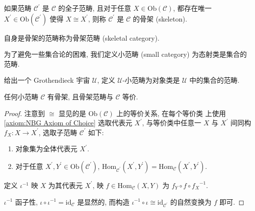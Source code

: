 \begin{definition}[骨架]
    如果范畴 \(\mathcal{C}^\prime\) 是 \(\mathcal{C}\) 的全子范畴, 且对于任意 \(X \in \mathrm{Ob} (\mathcal{C})\),
    都存在唯一 \(X^\prime \in \mathrm{Ob} (\mathcal{C}^\prime)\) 使得 \(X \cong X^\prime\), 则称 \(\mathcal{C}^\prime\) 是 \(\mathcal{C}\) 的骨架 (skeleton).

    自身是骨架的范畴称为骨架范畴 (skeletal category).
\end{definition}

\begin{definition}[小范畴]
    为了避免一些集合论的困难, 我们定义小范畴 (small category) 为态射类是集合的范畴.

    给出一个 Grothendieck 宇宙 \(\mathcal{U}\), 定义 \(\mathcal{U}\)-小范畴为对象类是 \(\mathcal{U}\) 中的集合的范畴.
\end{definition}

\begin{lemma}
    任何小范畴 \(\mathcal{C}\) 有骨架, 且骨架范畴与 \(\mathcal{C}\) 等价.

    \begin{proof}
        注意到 \(\cong\) 显见的是 \(\mathrm{Ob} (\mathcal{C})\) 上的等价关系, 在每个等价类
        上使用 \ref{axiom:NBG Axiom of Choice} 选取代表元 \(X^\prime\), 与等价类中任意一 \(X\) 与 \(X^\prime\) 间同构 \(f_X : X \to X^\prime\),
        选取子范畴 \(\mathcal{C}^\prime\) 如下:

        \begin{enumerate}
            \item 对象集为全体代表元 \(X^\prime\).
            \item 对于任意 \(X^\prime,Y^\prime \in \mathrm{Ob} (\mathcal{C}^\prime)\), \(\mathrm{Hom}_{\mathcal{C}^\prime} (X^\prime,Y^\prime) = \mathrm{Hom}_{\mathcal{C}} (X^\prime,Y^\prime) \).
        \end{enumerate}

        定义 \(\iota^{-1}\) 映 \(X\) 为其代表元 \(X^\prime\), 映 \(f \in \mathrm{Hom}_{\mathcal{C}} (X,Y)\) 为 
        \(f_Y \circ f \circ {f_X}^{-1}\).

        \(\iota^{-1}\) 函子性, \(\iota \circ \iota^{-1} = \mathrm{id}_{\mathcal{C}}\) 是显然的, 而构造 \(\iota^{-1} \circ \iota \cong \mathrm{id}_{\mathcal{C}^\prime}\) 的自然变换为 \(f\) 即可.
    \end{proof}
\end{lemma}

